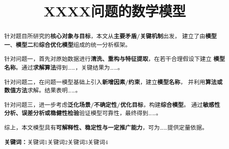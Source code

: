 \documentclass[UTF8,fontset=windows,a4paper,12pt]{ctexart}
\title{\sffamily\bfseries\zihao{2} XXXX问题的数学模型}
\author{}
\date{}
\providecommand{\keywords}[1]{\par\vspace{0.5em}\noindent\textbf{关键词：}#1}
\begin{document}
%

\maketitle

\begin{abstract}
%

针对题目所研究的\textbf{核心对象与目标}，本文从\textbf{主要矛盾/关键机制}出发，
建立了由\textbf{模型一}、\textbf{模型二}和\textbf{综合优化模型}组成的统一分析框架。

针对问题一，首先对原始数据进行\textbf{清洗、重构与特征提取}，在若干合理假设下建立
\textbf{模型名称}。通过\textbf{求解算法}得到……，关键结果为……。

针对问题二，在问题一模型基础上引入\textbf{新增因素/约束}，建立\textbf{模型名称}，
并利用\textbf{算法或数值方法}求解。结果表明……。

针对问题三，进一步考虑\textbf{泛化场景/不确定性/优化目标}，构建\textbf{综合模型}。
通过\textbf{敏感性分析、误差分析或稳健性检验}验证模型可靠性，最终得到……。

综上，本文模型具有\textbf{可解释性、稳定性与一定推广能力}，可为……提供定量依据。

\keywords{关键词1\quad 关键词2\quad 关键词3\quad 关键词4}
\end{abstract}

\end{document}
